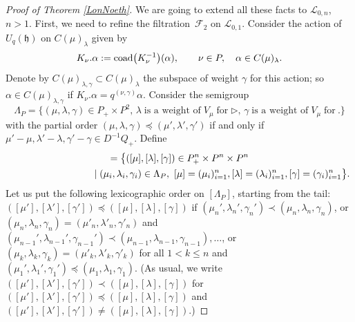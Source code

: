 \documentclass[pdftex]{sigma}
\numberwithin{equation}{section}
\theoremstyle{definition}
\newcommand{\Ll}{{\mathcal L}}
\begin{document}
\begin{proof}[Proof of Theorem \ref{LonNoeth}]
We are going to extend all these facts to $\Ll_{0,n}$, $n>1$. First, we need to refine the filtration~${\mathcal F}_2$ on $\Ll_{0,1}$. Consider the action of $U_q({\mathfrak h})$ on $C(\mu)_{\lambda}$ given by
\begin{equation}\label{coadweightnew}
K_\nu.\alpha := {\rm coad}\big(K_\nu^{-1}\big)(\alpha),\qquad \nu\in P, \quad \alpha \in C(\mu)_{\lambda}.
\end{equation}
Denote by $C(\mu)_{\lambda,\gamma} \subset C(\mu)_{\lambda}$ the subspace of weight $\gamma$ for
this action; so $\alpha \in C(\mu)_{\lambda,\gamma}$ if $K_\nu.\alpha= q^{(\nu,\gamma)}\alpha$.
Consider the semigroup
\[\Lambda_P=\{(\mu, \lambda,\gamma)\in P_+\times P^2, \, \lambda \;\text{is a weight of}\;V_\mu \;\text{for} \; \rhd ,\, \gamma \;\text{is a weight of}\;V_\mu \;\text{for}\ . \}\]
with the partial order $(\mu,\lambda,\gamma)\preceq (\mu', \lambda',\gamma')$ if and only if $\mu'-\mu,\lambda'-\lambda,\gamma'-\gamma\in D^{-1}Q_+$. Define
\begin{gather*}
[\Lambda_P] =\bigl\lbrace([\mu],[\lambda],[\gamma])\in P_+^n\times P^n\times P^n \\
\hphantom{[\Lambda_P] =\bigl\lbrace([\mu],[\lambda],[\gamma]}{} \mid (\mu_i,\lambda_i,\gamma_i)\in \Lambda_P,\ [\mu] = (\mu_i)_{i=1}^n, [\lambda] = (\lambda_i)_{i=1}^n, [\gamma]=(\gamma_i)_{i=1}^n\bigr\rbrace .
\end{gather*}
Let us put the following lexicographic order on $ [\Lambda_P]$, starting from the tail: $([\mu'],[\lambda'],[\gamma'])\preceq ([\mu], [\lambda],[\gamma])$ if $(\mu_n',\lambda_n',\gamma_n')\prec (\mu_n, \lambda_n,\gamma_n)$, or $(\mu_n,\lambda_n,\gamma_n)= (\mu'_n, \lambda'_n,\gamma'_n)$ and $(\mu_{n-1}',\lambda_{n-1}',\gamma_{n-1}')\prec (\mu_{n-1}, \lambda_{n-1},\gamma_{n-1}),\dots$, or $(\mu_k,\lambda_k,\gamma_k)= (\mu'_k, \lambda'_k,\gamma'_k)$ for all $1< k\leq n$ and $(\mu_1',\lambda_1',\gamma_1')\preceq (\mu_1, \lambda_1,\gamma_1)$. (As usual, we write $([\mu'],[\lambda'],[\gamma'])\prec ([\mu], [\lambda],[\gamma])$ for $([\mu'],[\lambda'],[\gamma'])\preceq ([\mu], [\lambda],[\gamma])$ and $([\mu'],[\lambda'],[\gamma'])\ne ([\mu], [\lambda],[\gamma])$.)


\end{proof}
\end{document}
